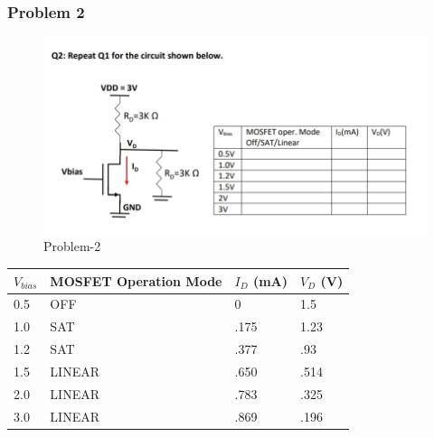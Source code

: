 \documentclass[11pt]{article}
\begin{document}
    \begin{center}
    \end{center}
    { \hspace*{\fill} \\}
    
    \begin{center}
    \end{center}
    { \hspace*{\fill} \\}
    
    \hypertarget{problem-2}{%
\subsubsection{Problem 2}\label{problem-2}}

\begin{figure}
\centering
\includegraphics{./image/act1_p2.jpg}
\caption{Problem-2}
\end{figure}

\begin{longtable}[]{@{}llll@{}}
\toprule
\(V_{bias}\) & MOSFET Operation Mode & \(I_D\) (mA) & \(V_D\)
(V)\tabularnewline
\midrule
\endhead
0.5 & OFF & 0 & 1.5\tabularnewline
1.0 & SAT & .175 & 1.23\tabularnewline
1.2 & SAT & .377 & .93\tabularnewline
1.5 & LINEAR & .650 & .514\tabularnewline
2.0 & LINEAR & .783 & .325\tabularnewline
3.0 & LINEAR & .869 & .196\tabularnewline
\bottomrule
\end{longtable}
\end{document}
